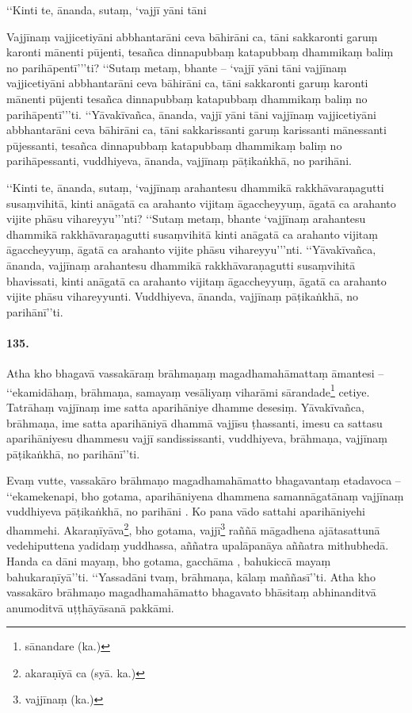 ‘‘Kinti te, ānanda, sutaṃ, ‘vajjī yāni tāni

Vajjīnaṃ vajjicetiyāni abbhantarāni ceva bāhirāni ca, tāni sakkaronti garuṃ karonti mānenti pūjenti, tesañca dinnapubbaṃ katapubbaṃ dhammikaṃ baliṃ no parihāpentī’’’ti? ‘‘Sutaṃ metaṃ, bhante – ‘vajjī yāni tāni vajjīnaṃ vajjicetiyāni abbhantarāni ceva bāhirāni ca, tāni sakkaronti garuṃ karonti mānenti pūjenti tesañca dinnapubbaṃ katapubbaṃ dhammikaṃ baliṃ no parihāpentī’’’ti. ‘‘Yāvakīvañca, ānanda, vajjī yāni tāni vajjīnaṃ vajjicetiyāni abbhantarāni ceva bāhirāni ca, tāni sakkarissanti garuṃ karissanti mānessanti pūjessanti, tesañca dinnapubbaṃ katapubbaṃ dhammikaṃ baliṃ no parihāpessanti, vuddhiyeva, ānanda, vajjīnaṃ pāṭikaṅkhā, no parihāni.

‘‘Kinti te, ānanda, sutaṃ, ‘vajjīnaṃ arahantesu dhammikā rakkhāvaraṇagutti susaṃvihitā, kinti anāgatā ca arahanto vijitaṃ āgaccheyyuṃ, āgatā ca arahanto vijite phāsu vihareyyu’’’nti? ‘‘Sutaṃ metaṃ, bhante ‘vajjīnaṃ arahantesu dhammikā rakkhāvaraṇagutti susaṃvihitā kinti anāgatā ca arahanto vijitaṃ āgaccheyyuṃ, āgatā ca arahanto vijite phāsu vihareyyu’’’nti. ‘‘Yāvakīvañca, ānanda, vajjīnaṃ arahantesu dhammikā rakkhāvaraṇagutti susaṃvihitā bhavissati, kinti anāgatā ca arahanto vijitaṃ āgaccheyyuṃ, āgatā ca arahanto vijite phāsu vihareyyunti. Vuddhiyeva, ānanda, vajjīnaṃ pāṭikaṅkhā, no parihānī’’ti.

\paragraph{135.} Atha kho bhagavā vassakāraṃ brāhmaṇaṃ magadhamahāmattaṃ āmantesi – ‘‘ekamidāhaṃ, brāhmaṇa, samayaṃ vesāliyaṃ viharāmi sārandade\footnote{sānandare (ka.)} cetiye. Tatrāhaṃ vajjīnaṃ ime satta aparihāniye dhamme desesiṃ. Yāvakīvañca, brāhmaṇa, ime satta aparihāniyā dhammā vajjīsu ṭhassanti, imesu ca sattasu aparihāniyesu dhammesu vajjī sandississanti, vuddhiyeva, brāhmaṇa, vajjīnaṃ pāṭikaṅkhā, no parihānī’’ti.

Evaṃ vutte, vassakāro brāhmaṇo magadhamahāmatto bhagavantaṃ etadavoca – ‘‘ekamekenapi, bho gotama, aparihāniyena dhammena samannāgatānaṃ vajjīnaṃ vuddhiyeva pāṭikaṅkhā, no parihāni . Ko pana vādo sattahi aparihāniyehi dhammehi. Akaraṇīyāva\footnote{akaraṇīyā ca (syā. ka.)}, bho gotama, vajjī\footnote{vajjīnaṃ (ka.)} raññā māgadhena ajātasattunā vedehiputtena yadidaṃ yuddhassa, aññatra upalāpanāya aññatra mithubhedā. Handa ca dāni mayaṃ, bho gotama, gacchāma , bahukiccā mayaṃ bahukaraṇīyā’’ti. ‘‘Yassadāni tvaṃ, brāhmaṇa, kālaṃ maññasī’’ti. Atha kho vassakāro brāhmaṇo magadhamahāmatto bhagavato bhāsitaṃ abhinanditvā anumoditvā uṭṭhāyāsanā pakkāmi.

